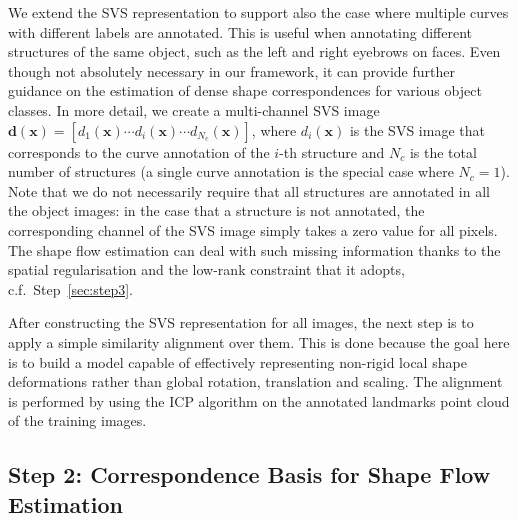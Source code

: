 
We extend the SVS representation to support also the case where multiple curves with different labels are annotated. This is useful when annotating different structures of the same object, such as the left and right eyebrows on faces. Even though not absolutely necessary in our framework, it can provide further guidance on the estimation of dense shape correspondences for various object classes. In more detail, we create a multi-channel SVS image $\bm{d}(\bm{x})=[d_1(\bm{x}) \cdots d_i(\bm{x}) \cdots d_{N_c}(\bm{x})]$, where $d_i(\bm{x})$ is the SVS image that corresponds to the curve annotation of the $i$-th structure and $N_c$ is the total number of structures (a single curve annotation is the special case where $N_c=1$). Note that we do not necessarily require that all structures are annotated in all the object images: in the case that a structure is not annotated, the corresponding channel of the SVS image simply takes a zero value for all pixels. The shape flow estimation can deal with such missing information thanks to the spatial regularisation and the low-rank constraint that it adopts, c.f.~Step~\ref{sec:step3}.

After constructing the SVS representation for all images, the next step is to apply a simple similarity alignment over them. This is done because the goal here is to build a model capable of effectively representing non-rigid local shape deformations rather than global rotation, translation and scaling. The alignment is performed by using the ICP algorithm \cite{Besl1992} on the annotated landmarks point cloud of the training images.


\vspace{0.2cm}
{\label{sec:step2}\subsection*{Step 2: Correspondence Basis for Shape Flow Estimation}}

